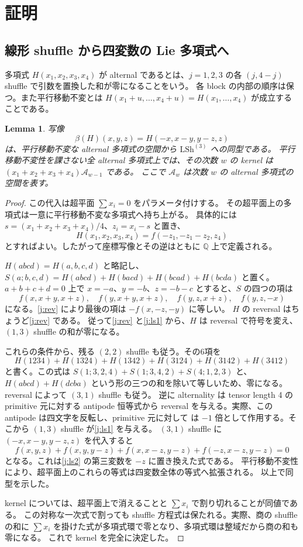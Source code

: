 \documentclass[12pt]{amsart}
\newtheorem{lem}[thm]{Lemma}
\theoremstyle{definition}
\theoremstyle{remark}
\numberwithin{equation}{section}
\newcommand{\Q}{\mathbb{Q}}
\newcommand{\LS}{\mathrm{LSh}}
\newcommand{\Al}{\mathcal A}
\numberwithin{equation}{section}
\begin{document}
\section{証明}
\subsection{線形 shuffle から四変数の Lie 多項式へ}
多項式 $H(x_1,x_2,x_3,x_4)$ が alternal であるとは、$j=1,2,3$ の各
$(j,4-j)$ shuffle で引数を置換した和が零になることをいう。
各 block の内部の順序は保つ。また平行移動不変とは
$H(x_1+u,\ldots,x_4+u)=H(x_1,\ldots,x_4)$ が成立することである。

\begin{lem}\label{j:coordinate}
写像
\begin{equation}\label{j:beta}
 \beta(H)(x,y,z)=H(-x,x-y,y-z,z)
\end{equation}
は、平行移動不変な alternal 多項式の空間から $\LS^{(3)}$ への同型である。
平行移動不変性を課さない全 alternal 多項式上では、その次数 $w$ の kernel は
$(x_1+x_2+x_3+x_4)\Al_{w-1}$ である。
ここで $\Al_w$ は次数 $w$ の alternal 多項式の空間を表す。
\end{lem}
\begin{proof}
この代入は超平面 $\sum x_i=0$ をパラメータ付けする。
その超平面上の多項式は一意に平行移動不変な多項式へ持ち上がる。
具体的には $s=(x_1+x_2+x_3+x_4)/4$、$z_i=x_i-s$ と置き、
\[
 H(x_1,x_2,x_3,x_4)=f(-z_1,-z_1-z_2,z_4)
\]
とすればよい。したがって座標写像とその逆はともに $\Q$ 上で定義される。

$H(abcd)=H(a,b,c,d)$ と略記し、
$S(a;b,c,d)=H(abcd)+H(bacd)+H(bcad)+H(bcda)$ と置く。
$a+b+c+d=0$ 上で $x=-a$、$y=-b$、$z=-b-c$ とすると、$S$ の四つの項は
\[
 f(x,x+y,x+z),\quad f(y,x+y,x+z),\quad
 f(y,z,x+z),\quad f(y,z,-x)
\]
になる。\eqref{j:rev} により最後の項は $-f(x,-z,-y)$ に等しい。
$H$ の reversal はちょうど\eqref{j:rev} である。
従って\eqref{j:rev} と\eqref{j:ls1} から、$H$ は reversal で符号を変え、
$(1,3)$ shuffle の和が零になる。

これらの条件から、残る $(2,2)$ shuffle も従う。その6項を
\[
 H(1234)+H(1324)+H(1342)+H(3124)+H(3142)+H(3412)
\]
と書く。この式は $S(1;3,2,4)+S(1;3,4,2)+S(4;1,2,3)$ と、
$H(abcd)+H(dcba)$ という形の三つの和を除いて等しいため、零になる。
reversal によって $(3,1)$ shuffle も従う。
逆に alternality は tensor length 4 の primitive 元に対する antipode 恒等式から
reversal を与える。実際、この antipode は四文字を反転し、primitive 元に対して
は $-1$ 倍として作用する。そこから $(1,3)$ shuffle が\eqref{j:ls1} を与える。
$(3,1)$ shuffle に $(-x,x-y,y-z,z)$ を代入すると
\[
 f(x,y,z)+f(x,y,y-z)+f(x,x-z,y-z)+f(-z,x-z,y-z)=0
\]
となる。これは\eqref{j:ls2} の第三変数を $-z$ に置き換えた式である。
平行移動不変性により、超平面上のこれらの等式は四変数全体の等式へ拡張される。
以上で同型を示した。

kernel については、超平面上で消えることと $\sum x_i$ で割り切れることが同値である。
この対称な一次式で割っても shuffle 方程式は保たれる。実際、商の shuffle の和に
$\sum x_i$ を掛けた式が多項式環で零となり、多項式環は整域だから商の和も零になる。
これで kernel を完全に決定した。
\end{proof}
\end{document}
